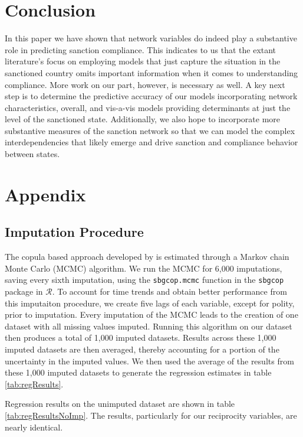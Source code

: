 \section*{Conclusion}
\label{conclusion}

In this paper we have shown that network variables do indeed play a substantive role in predicting sanction compliance. This indicates to us that the extant literature's focus on employing models that just capture the situation in the sanctioned country omits important information when it comes to understanding compliance. More work on our part, however, is necessary as well. A key next step is to determine the predictive accuracy of our models incorporating network characteristics, overall, and vis-a-vis models providing determinants at just the level of the sanctioned state. Additionally, we also hope to incorporate more substantive measures of the sanction network so that we can model the complex interdependencies that likely emerge and drive sanction and compliance behavior between states. 


\newpage
\section*{Appendix}
\label{appendix}

\subsection*{Imputation Procedure}

The copula based approach developed by \citet{hoff:2007} is estimated through a Markov chain Monte Carlo (MCMC) algorithm. We run the MCMC for 6,000 imputations, saving every sixth imputation, using the \texttt{sbgcop.mcmc} function in the \texttt{sbgcop} package in $\mathcal{R}$. To account for time trends and obtain better performance from this imputaiton procedure, we create five lags of each variable, except for polity, prior to imputation. Every imputation of the MCMC leads to the creation of one dataset with all missing values imputed. Running this algorithm on our dataset then produces a total of 1,000 imputed datasets. Results across these 1,000 imputed datasets are then averaged, thereby accounting for a portion of the uncertainty in the imputed values. We then used the average of the results from these 1,000 imputed datasets to generate the regression estimates in table \ref{tab:regResults}. 

Regression results on the unimputed dataset are shown in table \ref{tab:regResultsNoImp}. The results, particularly for our reciprocity variables, are nearly identical. 


\FloatBarrier

\newpage